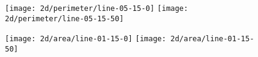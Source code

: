 \begin{figure}[H]
    \centering

    \texttt{[image: 2d/perimeter/line-05-15-0]}
    \texttt{[image: 2d/perimeter/line-05-15-50]}
    \label{fig:line_fixed_perimeter}

    \texttt{[image: 2d/area/line-01-15-0]}
    \texttt{[image: 2d/area/line-01-15-50]}
    \label{fig:line_fixed_area}
\end{figure}



